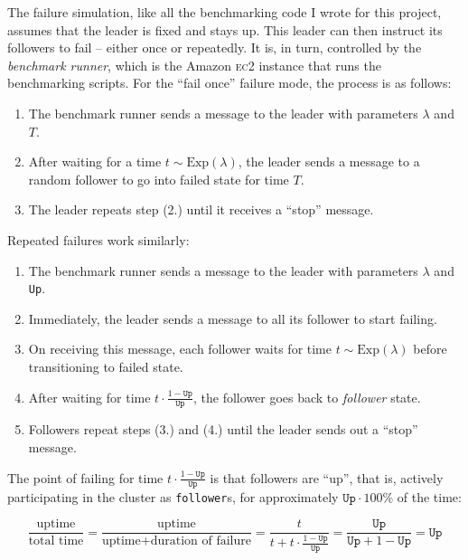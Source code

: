 \documentclass[11pt,chapterprefix=true,toc=bibliography,numbers=noendperiod,
               footnotes=multiple,twoside]{scrreprt}
\newcommand{\ECC}[0]{\textsc{ec}2 }
\begin{document}
The failure simulation, like all the benchmarking code I wrote for this project, assumes that the leader is fixed and stays up. This leader can then instruct its followers to fail -- either once or repeatedly. It is, in turn, controlled by the \emph{benchmark runner}, which is the Amazon \ECC instance that runs the benchmarking scripts. For the \enquote{fail once} failure mode, the process is as follows:

\begin{enumerate}
    \item The benchmark runner sends a message to the leader with parameters \(\lambda\) and \(T\).
    \item After waiting for a time \(t \sim \text{Exp}(\lambda)\), the leader sends a message to a random follower to go into failed state for time \(T\).
    \item The leader repeats step (2.) until it receives a \enquote{stop} message.
\end{enumerate}

Repeated failures work similarly:

\begin{enumerate}
    \item The benchmark runner sends a message to the leader with parameters \(\lambda\) and \texttt{Up}.
    \item Immediately, the leader sends a message to all its follower to start failing.
    \item On receiving this message, each follower waits for time \(t \sim \text{Exp}(\lambda)\) before transitioning to failed state.
    \item After waiting for time \(t \cdot \frac{1 - \texttt{Up}}{\texttt{Up}}\), the follower goes back to \textit{follower} state.
    \item Followers repeat steps (3.) and (4.) until the leader sends out a \enquote{stop} message.
\end{enumerate}

The point of failing for time \(t \cdot \frac{1 - \texttt{Up}}{\texttt{Up}}\) is that followers are \enquote{up}, that is, actively participating in the cluster as \texttt{follower}s, for approximately \(\texttt{Up} \cdot 100\%\) of the time:

\[ \frac{\text{uptime}}{\text{total time}}
 = \frac{\text{uptime}}{\text{uptime} + \text{duration of failure}}
 = \frac{t}{t + t \cdot \frac{1-\texttt{Up}}{\texttt{Up}}}
 = \frac{\texttt{Up}}{\texttt{Up} + 1 - \texttt{Up}} = \texttt{Up} \]
\end{document}
